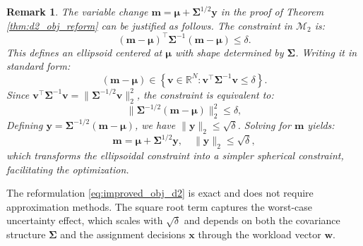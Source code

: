 \documentclass[preprint,12pt,authoryear]{elsarticle}
\newtheorem{remark}{Remark}
\begin{document}
\begin{remark}\label{rem:variable_change}
The variable change $\mathbf{m} = \boldsymbol{\mu} + \boldsymbol{\Sigma}^{1/2} \mathbf{y}$ in the proof of Theorem \ref{thm:d2_obj_reform} can be justified as follows. The constraint in $\mathcal{M}_2$ is:
\begin{equation}
(\mathbf{m} - \boldsymbol{\mu})^\top \boldsymbol{\Sigma}^{-1} (\mathbf{m} - \boldsymbol{\mu}) \leqslant \delta.
\end{equation}
This defines an ellipsoid centered at $\boldsymbol{\mu}$ with shape determined by $\boldsymbol{\Sigma}$. Writing it in standard form:
\begin{equation}
(\mathbf{m} - \boldsymbol{\mu}) \in \left\{ \mathbf{v} \in \mathbb{R}^N : \mathbf{v}^\top \boldsymbol{\Sigma}^{-1} \mathbf{v} \leqslant \delta \right\}.
\end{equation}
Since $\mathbf{v}^\top \boldsymbol{\Sigma}^{-1} \mathbf{v} = \|\boldsymbol{\Sigma}^{-1/2} \mathbf{v}\|_2^2$, the constraint is equivalent to:
\begin{equation}
\|\boldsymbol{\Sigma}^{-1/2} (\mathbf{m} - \boldsymbol{\mu})\|_2^2 \leqslant \delta,
\end{equation}
Defining $\mathbf{y} = \boldsymbol{\Sigma}^{-1/2} (\mathbf{m} - \boldsymbol{\mu})$, we have $\|\mathbf{y}\|_2 \leqslant \sqrt{\delta}$. Solving for $\mathbf{m}$ yields:
\begin{equation}
\mathbf{m} = \boldsymbol{\mu} + \boldsymbol{\Sigma}^{1/2} \mathbf{y}, \quad \|\mathbf{y}\|_2 \leqslant \sqrt{\delta},
\end{equation}
which transforms the ellipsoidal constraint into a simpler spherical constraint, facilitating the optimization.
\end{remark}

The reformulation \eqref{eq:improved_obj_d2} is exact and does not require approximation methods. The square root term captures the worst-case uncertainty effect, which scales with $\sqrt{\delta}$ and depends on both the covariance structure $\boldsymbol{\Sigma}$ and the assignment decisions $\mathbf{x}$ through the workload vector $\mathbf{w}$.
\end{document}
